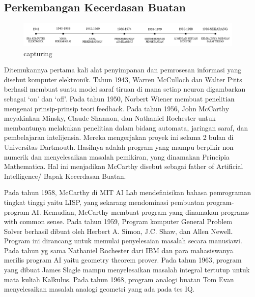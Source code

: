 \subsection{ Perkembangan Kecerdasan Buatan}
\begin{figure}[ht]
\centering
\includegraphics[scale=0.5]{figures/Screenshot_1.png}
\caption{capturing}
\label{perkembangan}
\end{figure}

Ditemukannya pertama kali alat penyimpanan dan pemrosesan informasi yang disebut komputer elektronik. Tahun 1943, Warren McCulloch dan Walter Pitts berhasil membuat suatu model saraf tiruan di mana setiap neuron digambarkan sebagai ‘on’ dan ‘off’. Pada tahun 1950, Norbert Wiener membuat penelitian mengenai prinsip-prinsip teori feedback. Pada tahun 1956, John McCarthy meyakinkan Minsky, Claude Shannon, dan Nathaniel Rochester untuk membantunya melakukan penelitian dalam bidang automata, jaringan saraf, dan pembelajaran intelijensia. Mereka mengerjakan proyek ini selama 2 bulan di Universitas Dartmouth. Hasilnya adalah program yang mampu berpikir non-numerik dan menyelesaikan masalah pemikiran, yang dinamakan Principia Mathematica. Hal ini menjadikan McCarthy disebut sebagai father of Artificial Intelligence/ Bapak Kecerdasan Buatan.

Pada tahun 1958, McCarthy di MIT AI Lab mendefinisikan bahasa pemrograman tingkat tinggi yaitu LISP, yang sekarang mendominasi pembuatan program-program AI. Kemudian, McCarthy membuat program yang dinamakan programs with common sense. Pada tahun 1959, Program komputer General Problem Solver berhasil dibuat oleh Herbert A. Simon, J.C. Shaw, dan Allen Newell. Program ini dirancang untuk memulai penyelesaian masalah secara manusiawi. Pada tahun yg sama Nathaniel Rochester dari IBM dan para mahasiswanya merilis program AI yaitu geometry theorem prover. Pada tahun 1963, program yang dibuat James Slagle mampu menyelesaikan masalah integral tertutup untuk mata kuliah Kalkulus. Pada tahun 1968, program analogi buatan Tom Evan menyelesaikan masalah analogi geometri yang ada pada tes IQ.

